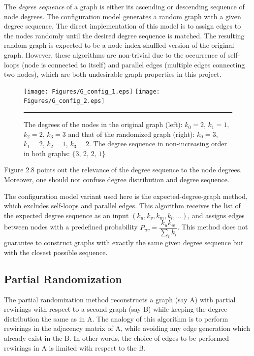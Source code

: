 The \textit{degree sequence} of a graph is either its ascending or descending sequence of node degrees. The configuration model generates a random graph with a given degree sequence. The direct implementation of this model is to assign edges to the nodes randomly until the desired degree sequence is matched. The resulting random graph is expected to be a node-index-shuffled version of the original graph. However, these algorithms are non-trivial due to the occurrence of self-loops (node is connected to itself) and parallel edges (multiple edges connecting two nodes), which are both undesirable graph properties in this project. 

\begin{figure}[htbp]
  \centering
	\texttt{[image: Figures/G\_config\_1.eps]}  
	\texttt{[image: Figures/G\_config\_2.eps]} 
    \rule{35em}{0.5pt}
    \caption[Degree Sequence Definition]{The degrees of the nodes in the original graph (left): $k_0 = 2$, $k_1 =1$, $k_2=2$, $k_3=3$ and that of the randomized graph (right): $k_0 = 3$, $k_1 =2$, $k_2=1$, $k_3=2$. The degree sequence in non-increasing order in both graphs: $\{3,\,2,\,2,\,1\}$}
  \label{fig:Degree Sequence Definition}
\end{figure}

Figure 2.8 points out the relevance of the degree sequence to the node degrees. Moreover, one should not confuse degree distribution and degree sequence.   

The configuration model variant used here is the expected-degree-graph method, which excludes self-loops and parallel edges. This algorithm receives the list of the expected degree sequence as an input $(k_u, k_v, k_m, k_l, ...)$, and assigns edges between nodes with a predefined probability $P_{uv}=\dfrac{k_u k_w}{\sum_{i}k_i}$. This method does not guarantee to construct graphs with exactly the same given degree sequence but with the closest possible sequence.  



 
\subsection{Partial Randomization}
 
The partial randomization method  reconstructs a graph (say A) with partial rewirings with respect to a second graph (say B) while keeping the degree distribution the same as in A. The analogy of this algorithm is to perform rewirings in the adjacency matrix of A, while avoiding any edge generation which already exist in the B. In other words, the choice of edges to be performed rewirings in A is limited with respect to the B. 

